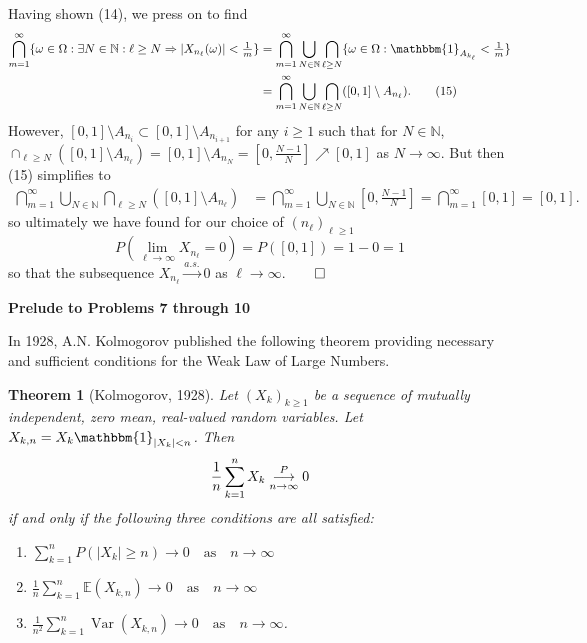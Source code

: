 \documentclass[10pt]{article}
\newcommand{\E}{\mathbb{E}}
\newcommand{\mbb}[1]{\mathbb{#1}}
\newcommand{\1}[1]{\mathbbm{1}_{#1}}
\DeclareMathOperator{\Var}{Var}
\newtheorem{theorem}{Theorem}
\begin{document}
    Having shown (14), we press on to find
    \begin{align*}
        \bigcap_{m=1}^\infty\{\omega\in\Omega:\exists N\in\mbb{N}:\ell\geq N\Rightarrow|X_{n_\ell}(\omega)|<\tfrac{1}{m}\}&=\bigcap_{m=1}^\infty\bigcup_{N\in\mbb{N}}\bigcap_{\ell\geq N}\{\omega\in\Omega:\1{A_{k_\ell}}<\tfrac{1}{m}\}\\
        &=\bigcap_{m=1}^\infty\bigcup_{N\in\mbb{N}}\bigcap_{\ell\geq N}([0,1]\setminus A_{n_\ell}).\tag{15}
    \end{align*}
    However, $[0,1]\setminus A_{n_i}\subset[0,1]\setminus A_{n_{i+1}}$ for any $i\geq 1$ such that for $N\in\mbb{N}$, $\cap_{\ell\geq N}([0,1]\setminus A_{n_\ell})=[0,1]\setminus A_{n_N}=[0,\tfrac{N-1}{N}]\nearrow[0,1]$ as $N\rightarrow\infty$.
    But then (15) simplifies to 
    \begin{align*}
        \bigcap_{m=1}^\infty\bigcup_{N\in\mbb{N}}\bigcap_{\ell\geq N}([0,1]\setminus A_{n_\ell})&=\bigcap_{m=1}^\infty\bigcup_{N\in\mbb{N}}[0,\tfrac{N-1}{N}]=\bigcap_{m=1}^\infty[0,1]=[0,1].
    \end{align*}
    so ultimately we have found for our choice of $(n_\ell)_{\ell\geq 1}$
    \[P(\lim_{\ell\rightarrow\infty}X_{n_\ell}=0)=P([0,1])=1-0=1\]
    so that the subsequence $X_{n_\ell}\overset{a.s.}{\longrightarrow}0$ as $\ell\rightarrow\infty$.\hfill{$\qed$}\\[5pt]
    \begin{center}
        {\bf Prelude to Problems 7 through 10}
    \end{center}
    In 1928, A.N. Kolmogorov published the following theorem providing necessary and sufficient conditions for the Weak Law of Large Numbers.
    \begin{theorem}[Kolmogorov, 1928]
        Let $(X_k)_{k\geq 1}$ be a sequence of mutually independent, zero mean, real-valued random variables. Let $X_{k,n}=X_k\1{|X_k|<n}$. Then
        \[\frac{1}{n}\sum_{k=1}^nX_k\overunderset{P}{n\rightarrow\infty}{\longrightarrow} 0\]
        if and only if the following three conditions are all satisfied:
        \begin{enumerate}
            \item $\sum_{k=1}^nP(|X_k|\geq n)\rightarrow 0\quad\text{as}\quad n\rightarrow\infty$
            \item $\frac{1}{n}\sum_{k=1}^n\E(X_{k,n})\rightarrow 0\quad\text{as}\quad n\rightarrow\infty$
            \item $\frac{1}{n^2}\sum_{k=1}^n\Var(X_{k,n})\rightarrow 0\quad\text{as}\quad n\rightarrow\infty$.
        \end{enumerate}
    \end{theorem}
\end{document}
